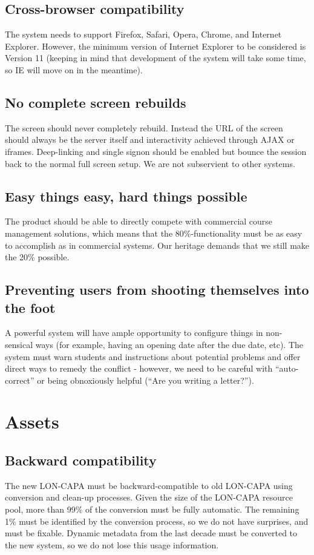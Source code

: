 \subsection{Cross-browser compatibility}
The system needs to support Firefox, Safari, Opera, Chrome, and Internet Explorer. However, the minimum version of Internet Explorer to be considered is Version 11 (keeping in mind that development of the system will take some time, so IE will move on in the meantime). 
\subsection{No complete screen rebuilds}
The screen should never completely rebuild. Instead the URL of the screen should always be the server itself and interactivity achieved through AJAX or iframes. Deep-linking and single signon should be enabled but bounce the session back to the normal full screen setup. We are not subservient to other systems.
\subsection{Easy things easy, hard things possible}
The product should be able to directly compete with commercial course management solutions, which means that the 80\%-functionality must be as easy to accomplish as in commercial systems. Our heritage demands that we still make the 20\% possible.
\subsection{Preventing users from shooting themselves into the foot}
A powerful system will have ample opportunity to configure things in non-sensical ways (for example, having an opening date after the due date, etc). The system must warn students and instructions about potential problems and offer direct ways to remedy the conflict - however, we need to be careful with ``auto-correct'' or being obnoxiously helpful (``Are you writing a letter?'').
\section{Assets}
\subsection{Backward compatibility}
The new LON-CAPA must be backward-compatible to old LON-CAPA using conversion and clean-up processes. Given the size of the LON-CAPA resource pool, more than 99\% of the conversion must be fully automatic. The remaining 1\% must be identified by the conversion process, so we do not have surprises, and must be fixable. Dynamic metadata from the last decade must be converted to the new system, so we do not lose this usage information.
